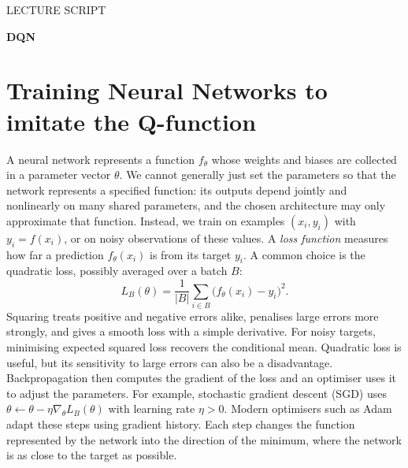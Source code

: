 \documentclass[11pt,a4paper]{article}
\begin{document}
{\sffamily\color{accent}\small LECTURE SCRIPT\par}
{\sffamily\bfseries\color{ink}\fontsize{27}{31}\selectfont DQN\par}
\vspace{9pt}

\section{Training Neural Networks to imitate the Q-function}
A neural network represents a function $f_\theta$ whose weights and biases are
collected in a parameter vector $\theta$. We cannot generally just set the parameters so that the network represents a
specified function: its outputs depend jointly and nonlinearly on many shared
parameters, and the chosen architecture may only approximate that function.
Instead, we train on
examples $(x_i,y_i)$ with $y_i=f(x_i)$, or on noisy observations of these values.
A \emph{loss function} measures how far a prediction $f_\theta(x_i)$ is from its
target $y_i$. A common choice is the quadratic loss, possibly averaged over a batch $B$:
\begin{equation}
 L_B(\theta)=\frac{1}{|B|}\sum_{i\in B}\bigl(f_\theta(x_i)-y_i\bigr)^2.
\end{equation}
Squaring treats positive and negative errors alike, penalises large errors more
strongly, and gives a smooth loss with a simple derivative. For noisy targets,
minimising expected squared loss recovers the conditional mean. Quadratic loss
is useful, but its sensitivity to large errors can also be a disadvantage.
Backpropagation then computes the gradient of the
loss and an optimiser uses it to adjust the parameters. For example, stochastic
gradient descent (SGD) uses $\theta\leftarrow\theta-\eta\nabla_\theta L_B(\theta)$
with learning rate $\eta>0$. Modern optimisers such as Adam adapt these steps using
gradient history. Each step changes the function represented by the network into the 
direction of the minimum, where the network is as close to the target as possible.
\end{document}
